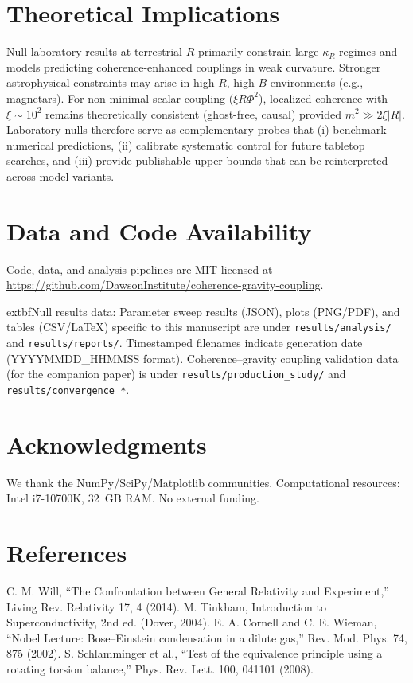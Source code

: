 \documentclass[10pt,twocolumn]{article}
\begin{document}
\section{Theoretical Implications}
Null laboratory results at terrestrial $R$ primarily constrain large \(\kappa_R\) regimes and models predicting coherence-enhanced couplings in weak curvature. Stronger astrophysical constraints may arise in high-$R$, high-$B$ environments (e.g., magnetars). For non-minimal scalar coupling ($\xi R\Phi^2$), localized coherence with $\xi\sim10^2$ remains theoretically consistent (ghost-free, causal) provided $m^2\!\gg\!2\xi|R|$. Laboratory nulls therefore serve as complementary probes that (i) benchmark numerical predictions, (ii) calibrate systematic control for future tabletop searches, and (iii) provide publishable upper bounds that can be reinterpreted across model variants.

\section{Data and Code Availability}
Code, data, and analysis pipelines are MIT-licensed at\: \url{https://github.com/DawsonInstitute/coherence-gravity-coupling}. 

	extbf{Null results data:} Parameter sweep results (JSON), plots (PNG/PDF), and tables (CSV/LaTeX) specific to this manuscript are under \texttt{results/analysis/} and \texttt{results/reports/}. Timestamped filenames indicate generation date (YYYYMMDD\_HHMMSS format). Coherence--gravity coupling validation data (for the companion paper) is under \texttt{results/production\_study/} and \texttt{results/convergence\_*}.

\section*{Acknowledgments}
We thank the NumPy/SciPy/Matplotlib communities. Computational resources: Intel i7-10700K, 32~GB RAM. No external funding.

\section*{References}
\begin{thebibliography}{9}
 C. M. Will, ``The Confrontation between General Relativity and Experiment,'' Living Rev. Relativity 17, 4 (2014).
 M. Tinkham, Introduction to Superconductivity, 2nd ed. (Dover, 2004).
 E. A. Cornell and C. E. Wieman, ``Nobel Lecture: Bose--Einstein condensation in a dilute gas,'' Rev. Mod. Phys. 74, 875 (2002).
 S. Schlamminger et al., ``Test of the equivalence principle using a rotating torsion balance,'' Phys. Rev. Lett. 100, 041101 (2008).
\end{thebibliography}
\end{document}
